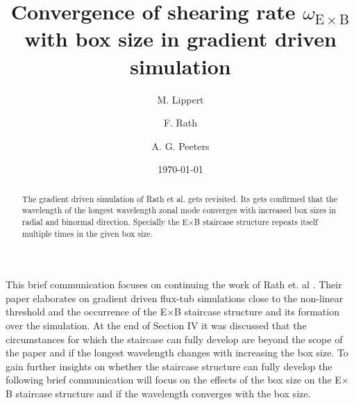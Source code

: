\documentclass[aip, amsmath, amssymb, reprint, twocolumn]{revtex4-1}
\begin{document}

\title[Convergence of shearing rate $\omega_{\mathrm{E}\times\mathrm{B}}$ with box size in gradient driven simulation]{
	Convergence of shearing rate $\omega_{\mathrm{E}\times\mathrm{B}}$ with box size in gradient driven simulation
}

\author{M. Lippert}
\author{F. Rath}
\author{A. G. Peeters}

\date{\today}


\begin{abstract}
	The gradient driven simulation of Rath et al.\cite{doi:10.1063/1.4961231} gets revisited. Its gets confirmed that the wavelength of the longest wavelength zonal mode converges with increased box sizes in radial and binormal direction. Specially the E$\times$B staircase structure repeats itself multiple times in the given box size.
\end{abstract}

\maketitle




This brief communication focuses on continuing the work of Rath et. al \cite{doi:10.1063/1.4961231}. 
Their paper elaborates on gradient driven flux-tub simulations close to the non-linear threshold and the occurrence of the E$\times$B staircase structure and its formation over the simulation.
At the end of Section IV it was discussed that the circumstances for which the staircase can fully develop are beyond the scope of the paper and if the longest wavelength changes with increasing the box size.
To gain further insights on whether the staircase structure can fully develop the following brief communication will focus on the effects of the box size on the E$\times$B staircase structure and if the wavelength converges with the box size.\bigskip
\end{document}
